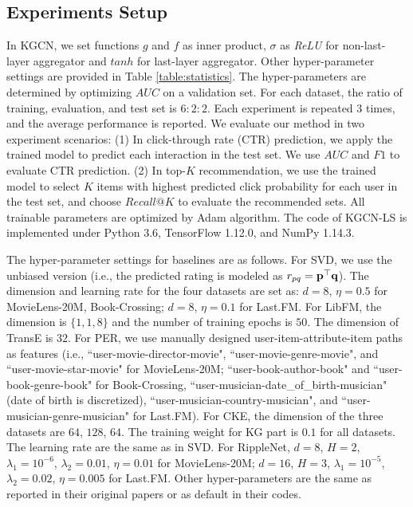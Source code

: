 \documentclass[sigconf]{acmart}
\begin{document}
	
	\subsection{Experiments Setup}
		In KGCN, we set functions $g$ and $f$ as inner product, $\sigma$ as \textit{ReLU} for non-last-layer aggregator and $tanh$ for last-layer aggregator.
		Other hyper-parameter settings are provided in Table \ref{table:statistics}.
		The hyper-parameters are determined by optimizing $AUC$ on a validation set.		
		For each dataset, the ratio of training, evaluation, and test set is $6:2:2$.
		Each experiment is repeated $3$ times, and the average performance is reported.
		We evaluate our method in two experiment scenarios:
		(1) In click-through rate (CTR) prediction, we apply the trained model to predict each interaction in the test set.
		We use $AUC$ and $F1$ to evaluate CTR prediction.
		(2) In top-$K$ recommendation, we use the trained model to select $K$ items with highest predicted click probability for each user in the test set, and choose $Recall@K$ to evaluate the recommended sets.
		All trainable parameters are optimized by Adam algorithm.
		The code of KGCN-LS is implemented under Python 3.6, TensorFlow 1.12.0, and NumPy 1.14.3.
		
		The hyper-parameter settings for baselines are as follows.
		For SVD, we use the unbiased version (i.e., the predicted rating is modeled as $r_{pq} = {\bf p}^\top {\bf q}$).
		The dimension and learning rate for the four datasets are set as: $d = 8$, $\eta = 0.5$ for MovieLens-20M, Book-Crossing; $d = 8$, $\eta = 0.1$ for Last.FM.
		For LibFM, the dimension is $\{1, 1, 8\}$ and the number of training epochs is $50$.
		The dimension of TransE is $32$.
		For PER, we use manually designed user-item-attribute-item paths as features (i.e., ``user-movie-director-movie", ``user-movie-genre-movie", and ``user-movie-star-movie" for MovieLens-20M; ``user-book-author-book" and ``user-book-genre-book" for Book-Crossing, ``user-musician-date\_of\_birth-musician" (date of birth is discretized), ``user-musician-country-musician", and ``user-musician-genre-musician" for Last.FM).
		For CKE, the dimension of the three datasets are $64$, $128$, $64$.
		The training weight for KG part is $0.1$ for all datasets.
		The learning rate are the same as in SVD.
		For RippleNet, $d=8$, $H=2$, $\lambda_1 = 10^{-6}$, $\lambda_2=0.01$, $\eta=0.01$ for MovieLens-20M; $d=16$, $H=3$, $\lambda_1 = 10^{-5}$, $\lambda_2=0.02$, $\eta=0.005$ for Last.FM.
		Other hyper-parameters are the same as reported in their original papers or as default in their codes.
		
\end{document}
